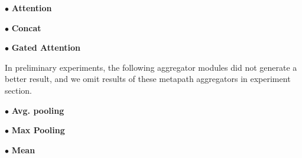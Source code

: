 $\bullet$ \textbf{Attention}

$\bullet$ \textbf{Concat}

$\bullet$ \textbf{Gated Attention}

In preliminary experiments, the following aggregator modules did not generate a better result, and we omit results of these metapath aggregators in experiment section.

$\bullet$ \textbf{Avg. pooling}

$\bullet$ \textbf{Max Pooling}

$\bullet$ \textbf{Mean}








